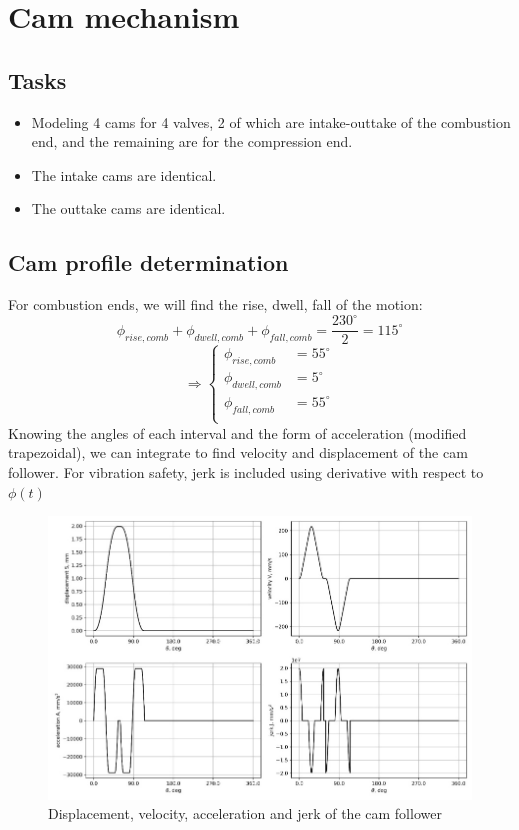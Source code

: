\section{Cam mechanism}
\subsection{Tasks}
\begin{itemize}
	\item Modeling 4 cams for 4 valves, 2 of which are intake-outtake of the combustion end, and the remaining are for the compression end.
	\item The intake cams are identical.
	\item The outtake cams are identical.
\end{itemize}
\subsection{Cam profile determination}
For combustion ends, we will find the rise, dwell, fall of the motion:
\[\phi_{rise,comb}+\phi_{dwell,comb}+\phi_{fall,comb}=\dfrac{230^\circ}{2}=115^\circ\]
\[\Rightarrow\left\{\begin{array}{ll}
\phi_{rise,comb}&=55^\circ\\
\phi_{dwell,comb}&=5^\circ\\
\phi_{fall,comb}&=55^\circ\\
\end{array}\right.\]
Knowing the angles of each interval and the form of acceleration (modified trapezoidal), we can integrate to find velocity and displacement of the cam follower. For vibration safety, jerk is included using derivative with respect to $ \phi(t) $
\begin{figure}[h]
	\centering
	\includegraphics[width=0.8\linewidth]{24}
	\caption{Displacement, velocity, acceleration and jerk of the cam follower}
	\label{fig:24}
\end{figure}\\

